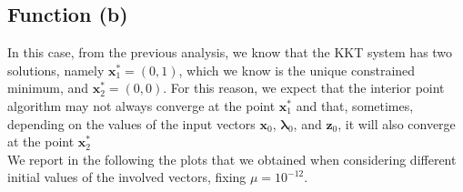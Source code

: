 \documentclass[a4paper,11pt]{article}
\begin{document}
\subsection*{Function (b)}
In this case, from the previous analysis, we know that the KKT system has two solutions, namely $\textbf{x}^*_{1}=(0,1)$, which we know is the unique constrained minimum, and $\textbf{x}^*_{2}=(0,0)$. For this reason, we expect that the interior point algorithm may not always converge at the point $\textbf{x}^*_{1}$ and that, sometimes, depending on the values of the input vectors $\textbf{x}_{0}$, $\boldsymbol{\lambda}_{0}$, and $\textbf{z}_{0}$, it will also converge at the point $\textbf{x}^*_{2}$\\

\noindent We report in the following the plots that we obtained when considering different initial values of the involved vectors, fixing $\mu=10^{-12}$.
\end{document}
